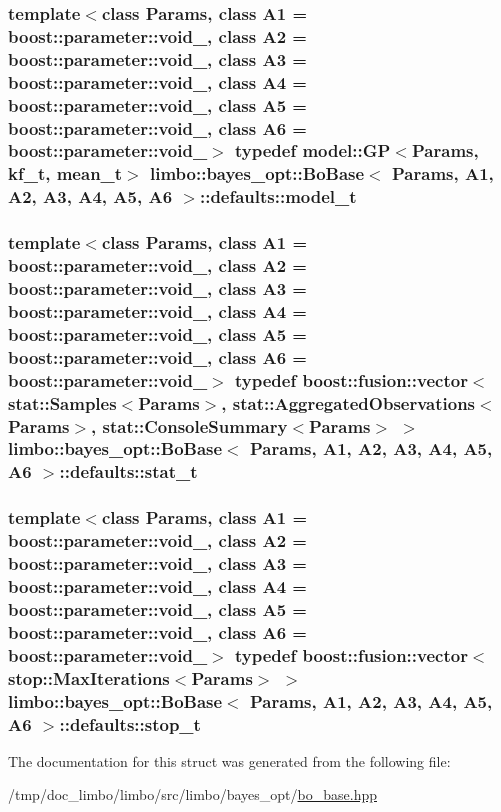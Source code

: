 \subsubsection[{model\+\_\+t}]{\setlength{\rightskip}{0pt plus 5cm}template$<$class Params, class A1 = boost\+::parameter\+::void\+\_\+, class A2 = boost\+::parameter\+::void\+\_\+, class A3 = boost\+::parameter\+::void\+\_\+, class A4 = boost\+::parameter\+::void\+\_\+, class A5 = boost\+::parameter\+::void\+\_\+, class A6 = boost\+::parameter\+::void\+\_\+$>$ typedef {\bf model\+::\+G\+P}$<$Params, {\bf kf\+\_\+t}, {\bf mean\+\_\+t}$>$ {\bf limbo\+::bayes\+\_\+opt\+::\+Bo\+Base}$<$ Params, A1, A2, A3, A4, A5, A6 $>$\+::{\bf defaults\+::model\+\_\+t}}\label{structlimbo_1_1bayes__opt_1_1_bo_base_1_1defaults_a07f65b6332c4f0c029069100feecb789}
\hypertarget{structlimbo_1_1bayes__opt_1_1_bo_base_1_1defaults_ab8f3991474723d27b9c77d0e0a76fce2}{}
\subsubsection[{stat\+\_\+t}]{\setlength{\rightskip}{0pt plus 5cm}template$<$class Params, class A1 = boost\+::parameter\+::void\+\_\+, class A2 = boost\+::parameter\+::void\+\_\+, class A3 = boost\+::parameter\+::void\+\_\+, class A4 = boost\+::parameter\+::void\+\_\+, class A5 = boost\+::parameter\+::void\+\_\+, class A6 = boost\+::parameter\+::void\+\_\+$>$ typedef boost\+::fusion\+::vector$<${\bf stat\+::\+Samples}$<$Params$>$, {\bf stat\+::\+Aggregated\+Observations}$<$Params$>$, {\bf stat\+::\+Console\+Summary}$<$Params$>$ $>$ {\bf limbo\+::bayes\+\_\+opt\+::\+Bo\+Base}$<$ Params, A1, A2, A3, A4, A5, A6 $>$\+::{\bf defaults\+::stat\+\_\+t}}\label{structlimbo_1_1bayes__opt_1_1_bo_base_1_1defaults_ab8f3991474723d27b9c77d0e0a76fce2}
\hypertarget{structlimbo_1_1bayes__opt_1_1_bo_base_1_1defaults_a66e1dbe1ccd9dbef0fdfc5c9faee9eff}{}
\subsubsection[{stop\+\_\+t}]{\setlength{\rightskip}{0pt plus 5cm}template$<$class Params, class A1 = boost\+::parameter\+::void\+\_\+, class A2 = boost\+::parameter\+::void\+\_\+, class A3 = boost\+::parameter\+::void\+\_\+, class A4 = boost\+::parameter\+::void\+\_\+, class A5 = boost\+::parameter\+::void\+\_\+, class A6 = boost\+::parameter\+::void\+\_\+$>$ typedef boost\+::fusion\+::vector$<${\bf stop\+::\+Max\+Iterations}$<$Params$>$ $>$ {\bf limbo\+::bayes\+\_\+opt\+::\+Bo\+Base}$<$ Params, A1, A2, A3, A4, A5, A6 $>$\+::{\bf defaults\+::stop\+\_\+t}}\label{structlimbo_1_1bayes__opt_1_1_bo_base_1_1defaults_a66e1dbe1ccd9dbef0fdfc5c9faee9eff}


The documentation for this struct was generated from the following file\+:\begin{DoxyCompactItemize}
\item 
/tmp/doc\+\_\+limbo/limbo/src/limbo/bayes\+\_\+opt/\hyperlink{bo__base_8hpp}{bo\+\_\+base.\+hpp}\end{DoxyCompactItemize}

